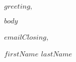 \documentclass{cobaltCoverLetter}
\date{$date$}
\begin{document}
  \changefontsize[9pt]{9pt}
  \thispagestyle{cobaltHeader}
   \vspace*{2cm}

  \noindent $greeting$,


  $body$

  \noindent
  $emailClosing$,
  \vspace*{0.75cm}

  \noindent
  \textbf{$firstName$ $lastName$}
\end{document}
